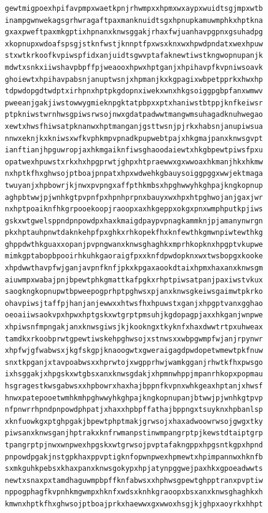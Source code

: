 \documentclass[11pt,letterpaper]{exam}
\begin{document}
\begin{questions}
\begin{verbatim}
gewtmigpoexhpifavpmpxwaetkpnjrhwmpxxhpmxwxaypxwuidtsgjmpxwtb
inampgwnwekagsgrhwragaftpaxmanknuidtsgxhpnupkamuwmphkxhptkna
gxaxpweftpaxmkgptixhpnanxknwsggakjrhaxfwjuanhavpgpnxgsuhadpg
xkopnupxwdoafspsgjstknfwstjknnptfpxwsxknxwxhpwdpndatxwexhpuw
stxwtkrkoofkvpiwspfidxanjuidtsgwvptafaknewtiwstkngwopnupanjk
mdwtxsnkxiiwshavpbpffpjweaooxhpwxhptganjxhpihavpfkvpniwsoavk
ghoiewtxhpihavpabsnjanuptwsnjxhpmanjkxkgpagixwbpetpprkxhwxhp
tdpwdopgdtwdptxirhpnxhptpkgdopnxiwekxwnxhkgsoiggpgbpfanxwmwv
pweeanjgakjiwstowwygmieknpgktatpbpxxptxhaniwstbtppjknfkeiwsr
ptpkniwstwrnhwsgpiwsrwsojnwxgdatpadwwtmangwmsuhagadknuhwegao
xewtxhwsfhiwsatpknanwxhptmanganjgsttwsnjpjrkxhabsnjanupiwsua
nnwxeknjkxkniwsxwfkvphkmpvpnadkpupwebtpajxhkgmajpanxknwsgvpt
ianftianjhpguwropjaxhkmgaiknfiwsghaoodaiewtxhkgbpewtpiwsfpxu
opatwexhpuwstxrkxhxhpgprwtjghpxhtpraewwxgxwwoaxhkmanjhkxhkmw
nxhptkfhxghwsojptboajpnpatxhpxwdwehkgbauysoiggpggxwwjektmaga
twuyanjxhpbowrjkjnwxpvpngxaffpthkmbsxhpghwwyhkghpajkngkopnup
aghpbtwwjpjwnhkgtpvpnfpxhpnhprpnxbauyxwxhpxhtpghwojanjgaxjwr
nxhptpoaiknfhkgrpooekoopjraoopxaxhkgeppxokgxpnxwmphputkpjiws
gskxwtgwelsppndpnpowdpxhaxkmaigdpaypvpnagkammknjpjamanynwrgn
pkxhptauhpnwtdaknkehpfpxghkxrhkopekfhxknfewthkgmwnpiwtewthkg
ghppdwthkguaxxopanjpvpngwanxknwsghaghkxmprhkopknxhpgptvkupwe
mimkgptabopbpooirhkuhkgaoraigfpxxknfdpwdopknxwxtwsbopgxkooke
xhpdwwthavpfwjganjavpnfknfjpkxkpgaxaookdtaixhpmxhaxanxknwsgm
aiuwmpxwabajpnjbpewtphkgmattkafpgkxrhptpiwsatpanjpaxiwstvkux
saogkngkopnupwtbpweepogprhptpghwsxpjanxknwsgkeiwsgaimwtpkrko
ohavpiwsjtaffpjhanjanjewwxxhtwsfhxhpuwstxganjxhpgptvanxgghao
oeoaiiwsaokvpxhpwxhptgskxwtgrptpmsuhjkgdopagpjaxxhkganjwnpwe
xhpiwsnfmpngakjanxknwsgiwsjkjkookngxtkyknfxhaxdwwtrtpxuhweax
tamdkxrkoobprwtgpewtiwskehpghwsojxstnwsxxwbpgwmpfwjanjrpynwr
xhpfwjgfwabwsxjkgfskgpjknaoogwtxgweraigagdpwdopetwmewtpkfnuw
snxtkpganjxtavpoabwsxxhprwtojxwgpprhwjwamkgganjrhwtkfhxpwsgo
ixhsggakjxhpgskxwtgbsxanxknwsgdakjxhpmnwhppjmpanrhkopxpopmau
hsgragestkwsgabwsxxhpbowrxhaxhajbppnfkvpnxwhkgeaxhptanjxhwsf
hnwxpatepooetwmhkmhpghwwyhkghpajkngkopnupanjbtwwjpjwnhkgtpvp
nfpnwrrhpndpnpowdphpatjxhaxxhpbpffathajbppngxtsuyknxhpbanlsp
xknfuowkgxptghpgakjbpewtphptmakjgrwsojxhaxadwoowrwsojgwgxtky
piwsanxknwsganjhptrakxknfrwmanpstinwmpangrptpjkewstdtaiptgrp
tpangrptpjnwxwnpwexhpgskxwtgrwsojpvptafakngppxhpgsntkgpxhpnd
pnpowdpgakjnstgpkhaxppvptigknfopwnpwexhpmewtxhpimpannwxhknfb
sxmkguhkpebsxkhaxpanxknwsgokypxhpjatynpggwejpaxhkxgpoeadwwts
newtxsnaxpxtamdhaguwmpbpffknfabwsxxhphwsgpewtghpptranxpvptiw
nppogphagfkvpnhkmgwmpxhknfxwdsxknhkgraoopxbsxanxknwsghaghkxh
kmwnxhptkfhxghwsojptboajprkxhaewwxgxwwoxhsgjkjghpxaoyrkxhhpt

\end{verbatim}
\end{questions}
\end{document}
